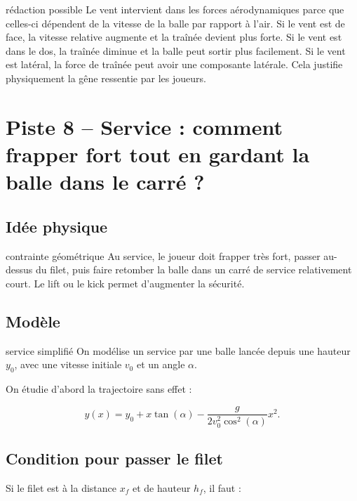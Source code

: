 \documentclass[11pt,a4paper]{article}
\begin{document}
\begin{oral}{rédaction possible}
Le vent intervient dans les forces aérodynamiques parce que celles-ci dépendent de la vitesse de la balle par rapport à l'air. Si le vent est de face, la vitesse relative augmente et la traînée devient plus forte. Si le vent est dans le dos, la traînée diminue et la balle peut sortir plus facilement. Si le vent est latéral, la force de traînée peut avoir une composante latérale. Cela justifie physiquement la gêne ressentie par les joueurs.
\end{oral}

\section{Piste 8 -- Service : comment frapper fort tout en gardant la balle dans le carré ?}

\subsection{Idée physique}

\begin{idee}{contrainte géométrique}
Au service, le joueur doit frapper très fort, passer au-dessus du filet, puis faire retomber la balle dans un carré de service relativement court. Le lift ou le kick permet d'augmenter la sécurité.
\end{idee}

\subsection{Modèle}

\begin{modele}{service simplifié}
On modélise un service par une balle lancée depuis une hauteur $y_0$, avec une vitesse initiale $v_0$ et un angle $\alpha$.

On étudie d'abord la trajectoire sans effet :

\[
y(x)=y_0+x\tan(\alpha)-\frac{g}{2v_0^2\cos^2(\alpha)}x^2.
\]
\end{modele}

\subsection{Condition pour passer le filet}

Si le filet est à la distance $x_f$ et de hauteur $h_f$, il faut :
\end{document}
